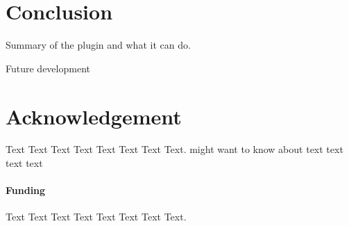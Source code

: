 \documentclass{bioinfo}
\begin{document}
\section{Conclusion}

Summary of the plugin and what it can do.

Future development



\section*{Acknowledgement}
Text Text Text Text Text Text  Text Text.  \citealp{Boffelli03} might want to know about  text text text text

\paragraph{Funding\textcolon} Text Text Text Text Text Text  Text Text.


%
%
%
%
%
%
%

\end{document}
